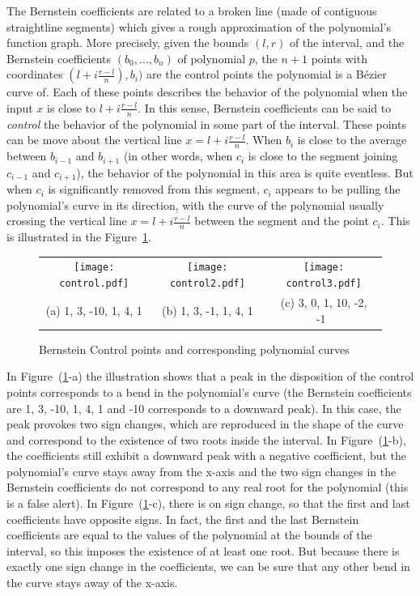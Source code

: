 \documentclass{mscs}
\begin{document}
\label{sec:geometrybernstein}
The Bernstein coefficients are related to a broken line (made of
contiguous straightline segments) which gives a rough approximation of the
polynomial's function graph.  More precisely, given the bounds \((l,r)\)
of the interval, and the Bernstein coefficients \((b_0,\ldots, b_n)\)
of polynomial $p$, the $n+1$ points with coordinates \((l + i
\frac{r-l}{n}), b_i)\) are the control points the polynomial
is a B\'ezier curve of. Each of these points describes
the behavior of the polynomial when the input \(x\) is close to
\(l+i\frac{r-l}{n}\). In this sense, Bernstein coefficients can be said to
{\em control} the behavior of the polynomial in some part of the interval.
These points can
be move about the vertical line \(x=l + i\frac{r-l}{n}\).  When \(b_i\) is
close to the average between \(b_{i-1}\) and \(b_{i+1}\) (in other words, when
\(c_i\) is close to the segment joining \(c_{i-1}\) and \(c_{i+1}\)), the
behavior of the polynomial in this area is quite eventless.  But when \(c_i\)
is significantly removed from this segment, \(c_i\) appears to be pulling the
polynomial's curve in its direction, with the curve of the polynomial usually
crossing the vertical line \(x=l+i\frac{r-l}{n}\) between the segment and
the point \(c_i\).  This is illustrated in the Figure~\ref{control}.
\begin{figure}
\begin{center}
\begin{tabular}{ccc}
\texttt{[image: control.pdf]}&
\texttt{[image: control2.pdf]}&
\texttt{[image: control3.pdf]}\\
(a) 1, 3, -10, 1, 4, 1 & (b) 1, 3, -1, 1, 4, 1 & (c) 3, 0, 1, 10, -2, -1\
\end{tabular}
\end{center}
\caption{\label{control} Bernstein Control points and corresponding polynomial curves}
\end{figure}

In Figure~{(\ref{control}-a)} the illustration shows that a peak in
the disposition of the control points corresponds to a bend in the
polynomial's curve (the Bernstein coefficients are 1, 3, -10, 1, 4, 1
and -10 corresponds to a downward peak).  In this case, the peak
provokes two sign changes, which are reproduced in the shape of the
curve and correspond to the existence of two roots inside the
interval.  In Figure~(\ref{control}-b), the coefficients still exhibit
a downward peak with a negative coefficient, but the polynomial's
curve stays away from the x-axis and the two sign changes in the
Bernstein coefficients do not correspond to any real root for the
polynomial (this is a false alert).  In Figure~(\ref{control}-c),
there is on sign change, so that the first and last coefficients have
opposite signs.  In fact, the first and the last Bernstein
coefficients are equal to the values of the polynomial at the bounds
of the interval, so this imposes the existence of at least one root.
But because there is exactly one sign change in the coefficients, we
can be sure that any other bend in the curve stays away of the x-axis.
\end{document}
